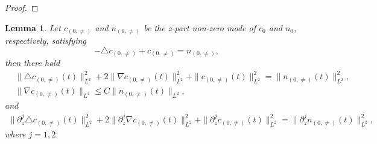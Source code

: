 \documentclass[12pt, reqno]{amsart}
\newtheorem{lemma}{Lemma}[section]
\numberwithin{equation}{section}
\begin{document}
\begin{proof}
	\end{proof}
	
	\begin{lemma}\label{lem:ellip_4}
		Let $c_{(0,\neq)}$ and $n_{(0,\neq)}$ be the z-part non-zero mode of $c_0$ and $n_0$,
		respectively, satisfying
		$$-\triangle c_{(0,\neq )}+c_{(0,\neq )}=n_{(0,\neq )},$$
		then there hold
		\begin{align*}
			&\|\triangle c_{(0,\neq )}(t)\|^2_{L^2}
			+2\|\nabla c_{(0,\neq )}(t)\|^2_{L^2}
			+\|c_{(0,\neq )}(t)\|^2_{L^2}=\|n_{(0,\neq )}(t)\|^2_{L^2},\\
			&\|\nabla c_{(0,\neq )}(t)\|_{L^4}\leq C\|n_{(0,\neq )}(t)\|_{L^2},
		\end{align*}
		and
		\begin{equation*}
			\begin{aligned}
				\|\partial_z^j\triangle c_{(0,\neq )}(t)\|^2_{L^2}
				+2\|\partial_z^j\nabla c_{(0,\neq )}(t)\|^2_{L^2}
				+\|\partial_z^j c_{(0,\neq )}(t)\|^2_{L^2}=\|\partial_z^jn_{(0,\neq )}(t)\|^2_{L^2},
			\end{aligned}
		\end{equation*}
		where $j=1,2.$
	\end{lemma}
	
\end{document}
